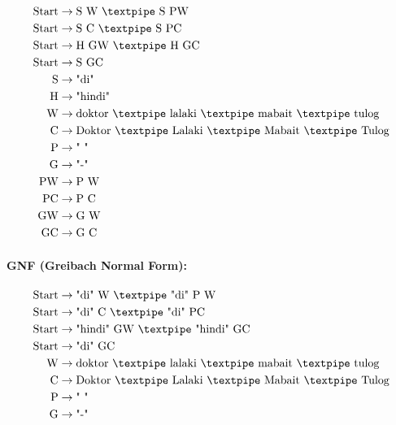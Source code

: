 \begin{equation*}
    \begin{aligned}
        \text{Start}   & \rightarrow \text{S W {\textpipe} S PW} \\
        \text{Start}   & \rightarrow \text{S C {\textpipe} S PC} \\
        \text{Start}   & \rightarrow \text{H GW {\textpipe} H GC} \\
        \text{Start}   & \rightarrow \text{S GC} \\
        \text{S}    & \rightarrow \text{"di"}\\
        \text{H}    & \rightarrow \text{"hindi"}\\
        \text{W} & \rightarrow \text{doktor {\textpipe} lalaki {\textpipe} mabait {\textpipe} tulog}   \\
        \text{C} & \rightarrow \text{Doktor {\textpipe} Lalaki {\textpipe} Mabait {\textpipe} Tulog}   \\
        \text{P}   & \rightarrow \text{" "}\\
        \text{G} & \rightarrow \text{"-"}\\
        \text{PW}      & \rightarrow \text{P W}\\
        \text{PC}      & \rightarrow \text{P C}\\
        \text{GW}      & \rightarrow \text{G W}\\
        \text{GC}      & \rightarrow \text{G C}
    \end{aligned}
\end{equation*}

\paragraph{GNF (Greibach Normal Form):}

\begin{equation*}
    \begin{aligned}
        \text{Start}   & \rightarrow \text{"di" W {\textpipe} "di" P W} \\
        \text{Start}   & \rightarrow \text{"di" C {\textpipe} "di" PC} \\
        \text{Start}   & \rightarrow \text{"hindi" GW {\textpipe} "hindi" GC} \\
        \text{Start}   & \rightarrow \text{"di" GC} \\
        \text{W} & \rightarrow \text{doktor {\textpipe} lalaki {\textpipe} mabait {\textpipe} tulog}   \\
        \text{C} & \rightarrow \text{Doktor {\textpipe} Lalaki {\textpipe} Mabait {\textpipe} Tulog}   \\
        \text{P}   & \rightarrow \text{" "}\\
        \text{G} & \rightarrow \text{"-"}
    \end{aligned}
\end{equation*}

